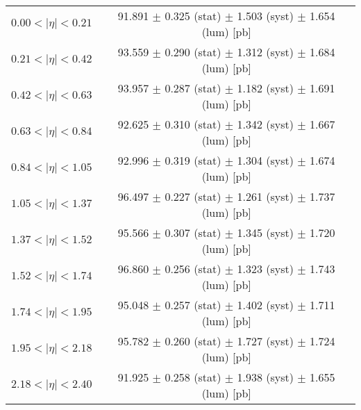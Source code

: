 \begin{tabular}{lc}
\hline
$0.00 < |\eta| <0.21$          & 91.891 $\pm$ 0.325 (stat) $\pm$ 1.503 (syst) $\pm$ 1.654 (lum) [pb]  \\
$0.21 < |\eta| <0.42$          & 93.559 $\pm$ 0.290 (stat) $\pm$ 1.312 (syst) $\pm$ 1.684 (lum) [pb]  \\
$0.42 < |\eta| <0.63$          & 93.957 $\pm$ 0.287 (stat) $\pm$ 1.182 (syst) $\pm$ 1.691 (lum) [pb]  \\
$0.63 < |\eta| <0.84$          & 92.625 $\pm$ 0.310 (stat) $\pm$ 1.342 (syst) $\pm$ 1.667 (lum) [pb]  \\
$0.84 < |\eta| <1.05$          & 92.996 $\pm$ 0.319 (stat) $\pm$ 1.304 (syst) $\pm$ 1.674 (lum) [pb]  \\
$1.05 < |\eta| <1.37$          & 96.497 $\pm$ 0.227 (stat) $\pm$ 1.261 (syst) $\pm$ 1.737 (lum) [pb]  \\
$1.37 < |\eta| <1.52$          & 95.566 $\pm$ 0.307 (stat) $\pm$ 1.345 (syst) $\pm$ 1.720 (lum) [pb]  \\
$1.52 < |\eta| <1.74$          & 96.860 $\pm$ 0.256 (stat) $\pm$ 1.323 (syst) $\pm$ 1.743 (lum) [pb]  \\
$1.74 < |\eta| <1.95$          & 95.048 $\pm$ 0.257 (stat) $\pm$ 1.402 (syst) $\pm$ 1.711 (lum) [pb]  \\
$1.95 < |\eta| <2.18$          & 95.782 $\pm$ 0.260 (stat) $\pm$ 1.727 (syst) $\pm$ 1.724 (lum) [pb]  \\
$2.18 < |\eta| <2.40$          & 91.925 $\pm$ 0.258 (stat) $\pm$ 1.938 (syst) $\pm$ 1.655 (lum) [pb]  \\
\hline
\end{tabular}

